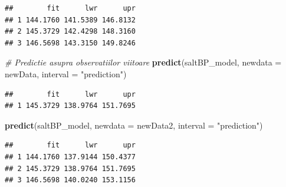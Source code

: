 \documentclass[]{article}
\newenvironment{Shaded}{\begin{snugshade}}{\end{snugshade}}
\newcommand{\KeywordTok}[1]{\textcolor[rgb]{0.13,0.29,0.53}{\textbf{{#1}}}}
\newcommand{\DataTypeTok}[1]{\textcolor[rgb]{0.13,0.29,0.53}{{#1}}}
\newcommand{\StringTok}[1]{\textcolor[rgb]{0.31,0.60,0.02}{{#1}}}
\newcommand{\CommentTok}[1]{\textcolor[rgb]{0.56,0.35,0.01}{\textit{{#1}}}}
\newcommand{\NormalTok}[1]{{#1}}
\begin{document}
\begin{verbatim}
##        fit      lwr      upr
## 1 144.1760 141.5389 146.8132
## 2 145.3729 142.4298 148.3160
## 3 146.5698 143.3150 149.8246
\end{verbatim}

\begin{Shaded}
\begin{Highlighting}[]
\CommentTok{# Predictie asupra observatiilor viitoare}
\KeywordTok{predict}\NormalTok{(saltBP_model, }\DataTypeTok{newdata =} \NormalTok{newData, }\DataTypeTok{interval =} \StringTok{"prediction"}\NormalTok{)}
\end{Highlighting}
\end{Shaded}

\begin{verbatim}
##        fit      lwr      upr
## 1 145.3729 138.9764 151.7695
\end{verbatim}

\begin{Shaded}
\begin{Highlighting}[]
\KeywordTok{predict}\NormalTok{(saltBP_model, }\DataTypeTok{newdata =} \NormalTok{newData2, }\DataTypeTok{interval =} \StringTok{"prediction"}\NormalTok{)}
\end{Highlighting}
\end{Shaded}

\begin{verbatim}
##        fit      lwr      upr
## 1 144.1760 137.9144 150.4377
## 2 145.3729 138.9764 151.7695
## 3 146.5698 140.0240 153.1156
\end{verbatim}
\end{document}
